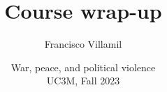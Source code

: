 \documentclass[aspectratio=43]{beamer}
\title{\huge Course wrap-up}
\author{Francisco Villamil}
\date{War, peace, and political violence\\UC3M, Fall 2023}
\begin{document}
\begin{frame}
  \titlepage
\end{frame}
\end{document}
